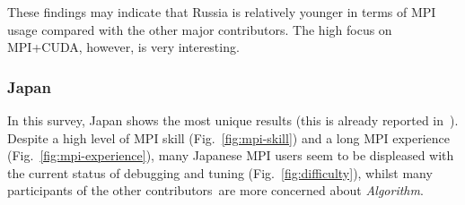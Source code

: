 \documentclass[preprint,5p,times]{elsarticle}
\def\myquote#1{{\it #1}}
\newcommand{\revision}[2]{{\color{blue}#2}}
\def\countries{contributors\xspace{}}%
\def\mcountries{major contributors\xspace{}}%
\begin{document}
These findings may indicate that Russia is relatively younger in terms
of MPI usage compared with the other \mcountries. The high \revision{concern}{focus} on
MPI+CUDA, however, is very interesting.

\subsubsection*{Japan}

In this survey, Japan shows the most unique results (this is already reported
in~\cite{swopp2019}). Despite a high level of MPI skill
(Fig.~\ref{fig:mpi-skill}) and a long MPI experience
(Fig.~\ref{fig:mpi-experience}), many Japanese MPI users seem to be displeased
with the current status of debugging and tuning (Fig.~\ref{fig:difficulty}),
whilst many participants of the other \countries\ are more concerned about
\myquote{Algorithm}.
\end{document}
